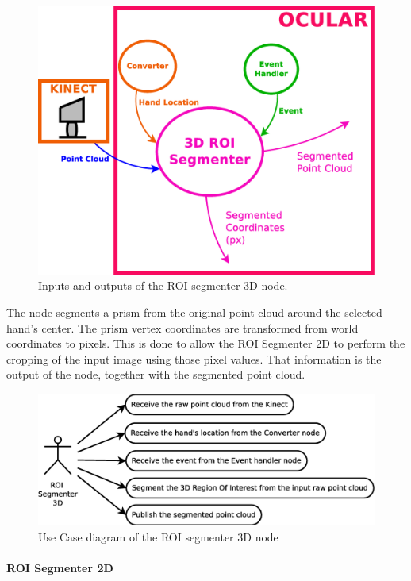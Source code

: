 		\begin{figure}[H]
			\begin{center}
			\includegraphics[width=0.5\linewidth]{img/diagrams/node_roi3d.eps}
			\caption[ROI segmenter 3D node I/O]{Inputs and outputs of the ROI segmenter 3D node.}		
			\label{node_roi3d}
			\end{center}
		\end{figure}


	The node segments a prism from the original point cloud around the selected hand's center. 
	The prism vertex coordinates are transformed from world coordinates to pixels. 
	This is done to allow the ROI Segmenter 2D to perform the cropping of the input image using those pixel values. 
	That information is the output of the node, together with the segmented point cloud. 

	\begin{figure}[H]
		\centering
	\includegraphics[scale=0.4]{img/diagrams/uc_roi_segmenter_3d.eps}
		\caption[Use case diagram ROI segmenter 3D node]{Use Case diagram of the ROI segmenter 3D node}
		
	\end{figure}
 

\paragraph{ROI Segmenter 2D}\mbox{}\\
	\label{roi_segmenter_2d}
	
